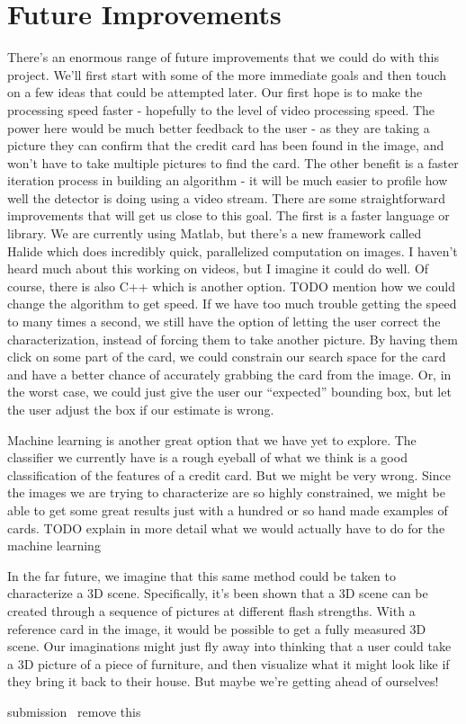 \documentclass[10pt,twocolumn,letterpaper]{article}
\begin{document}
\section{Future Improvements}
There’s an enormous range of future improvements that we could do with this project. We’ll first start with some of the more immediate goals and then touch on a few ideas that could be attempted later. Our first hope is to make the processing speed faster - hopefully to the level of video processing speed. The power here would be much better feedback to the user - as they are taking a picture they can confirm that the credit card has been found in the image, and won’t have to take multiple pictures to find the card. The other benefit is a faster iteration process in building an algorithm - it will be much easier to profile how well the detector is doing using a video stream. There are some straightforward improvements that will get us close to this goal. The first is a faster language or library. We are currently using Matlab, but there’s a new framework called Halide which does incredibly quick, parallelized computation on images. I haven’t heard much about this working on videos, but I imagine it could do well. Of course, there is also C++ which is another option. TODO mention how we could change the algorithm to get speed.
If we have too much trouble getting the speed to many times a second, we still have the option of letting the user correct the characterization, instead of forcing them to take another picture. By having them click on some part of the card, we could constrain our search space for the card and have a better chance of accurately grabbing the card from the image. Or, in the worst case, we could just give the user our “expected” bounding box, but let the user adjust the box if our estimate is wrong.

Machine learning is another great option that we have yet to explore. The classifier we currently have is a rough eyeball of what we think is a good classification of the features of a credit card. But we might be very wrong. Since the images we are trying to characterize are so highly constrained, we might be able to get some great results just with a hundred or so hand made examples of cards. TODO explain in more detail what we would actually have to do for the machine learning

In the far future, we imagine that this same method could be taken to characterize a 3D scene. Specifically, it’s been shown that a 3D scene can be created through a sequence of pictures at different flash strengths. With a reference card in the image, it would be possible to get a fully measured 3D scene. Our imaginations might just fly away into thinking that a user could take a 3D picture of a piece of furniture, and then visualize what it might look like if they bring it back to their house. But maybe we’re getting ahead of ourselves!


submission~\cite{Authors13}  remove this




{\small


}
\end{document}
